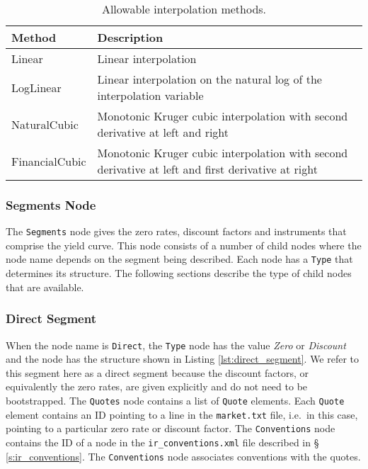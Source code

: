 \begin{table}[h]
\centering
  \begin{tabu} to 0.9\linewidth {| X[-1.5,l,m] | X[-5,l,m] |}
    \hline
    \bfseries{Method} & \bfseries{Description} \\
    \hline
    Linear & Linear interpolation \\ \hline
    LogLinear & Linear interpolation on the natural log of the interpolation variable \\ \hline
    NaturalCubic & Monotonic Kruger cubic interpolation with second derivative at left and right \\ \hline
    FinancialCubic & Monotonic Kruger cubic interpolation with second derivative at left and 
                     first derivative at right \\ \hline
  \end{tabu}
  \caption{Allowable interpolation methods.}
  \label{tab:allow_interp_methods}
\end{table}
\subsubsection*{Segments Node} \label{ss:segments_node}
The \lstinline!Segments! node gives the zero rates, discount factors and instruments that comprise the yield curve. This 
node consists of a number of child nodes where the node name depends on the segment being described. Each node has a 
\lstinline!Type! that determines its structure. The following sections describe the type of child nodes that are 
available.

\subsubsection*{Direct Segment}
When the node name is \lstinline!Direct!, the \lstinline!Type! node has the value \emph{Zero} or \emph{Discount} and the 
node has the structure shown in Listing \ref{lst:direct_segment}. We refer to this segment here as a direct segment 
because the discount factors, or equivalently the zero rates, are given explicitly and do not need to be bootstrapped. The 
\lstinline!Quotes! node contains a list of \lstinline!Quote! elements. Each \lstinline!Quote! element contains an ID 
pointing to a line in the {\tt market.txt} file, i.e.\ in this case, pointing to a particular zero rate or discount 
factor. The \lstinline!Conventions! node contains the ID of a node in the {\tt ir\_conventions.xml} file described in \S 
\ref{s:ir_conventions}. The \lstinline!Conventions! node associates conventions with the quotes.


